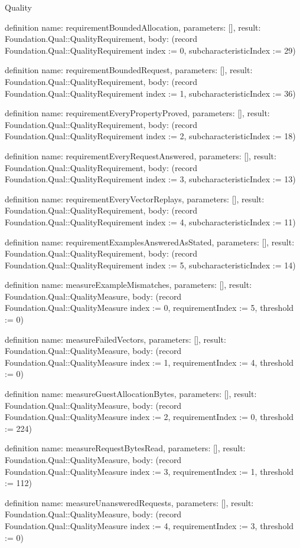 \begin{lexlean}{Quality}
\begin{semanticmodule}
definition{
  name: requirementBoundedAllocation,
  parameters: [],
  result: Foundation.Qual::QualityRequirement,
  body: (record Foundation.Qual::QualityRequirement {index := 0, subcharacteristicIndex := 29})
}

definition{
  name: requirementBoundedRequest,
  parameters: [],
  result: Foundation.Qual::QualityRequirement,
  body: (record Foundation.Qual::QualityRequirement {index := 1, subcharacteristicIndex := 36})
}

definition{
  name: requirementEveryPropertyProved,
  parameters: [],
  result: Foundation.Qual::QualityRequirement,
  body: (record Foundation.Qual::QualityRequirement {index := 2, subcharacteristicIndex := 18})
}

definition{
  name: requirementEveryRequestAnswered,
  parameters: [],
  result: Foundation.Qual::QualityRequirement,
  body: (record Foundation.Qual::QualityRequirement {index := 3, subcharacteristicIndex := 13})
}

definition{
  name: requirementEveryVectorReplays,
  parameters: [],
  result: Foundation.Qual::QualityRequirement,
  body: (record Foundation.Qual::QualityRequirement {index := 4, subcharacteristicIndex := 11})
}

definition{
  name: requirementExamplesAnsweredAsStated,
  parameters: [],
  result: Foundation.Qual::QualityRequirement,
  body: (record Foundation.Qual::QualityRequirement {index := 5, subcharacteristicIndex := 14})
}

definition{
  name: measureExampleMismatches,
  parameters: [],
  result: Foundation.Qual::QualityMeasure,
  body: (record Foundation.Qual::QualityMeasure {index := 0, requirementIndex := 5, threshold := 0})
}

definition{
  name: measureFailedVectors,
  parameters: [],
  result: Foundation.Qual::QualityMeasure,
  body: (record Foundation.Qual::QualityMeasure {index := 1, requirementIndex := 4, threshold := 0})
}

definition{
  name: measureGuestAllocationBytes,
  parameters: [],
  result: Foundation.Qual::QualityMeasure,
  body: (record Foundation.Qual::QualityMeasure {index := 2, requirementIndex := 0, threshold := 224})
}

definition{
  name: measureRequestBytesRead,
  parameters: [],
  result: Foundation.Qual::QualityMeasure,
  body: (record Foundation.Qual::QualityMeasure {index := 3, requirementIndex := 1, threshold := 112})
}

definition{
  name: measureUnansweredRequests,
  parameters: [],
  result: Foundation.Qual::QualityMeasure,
  body: (record Foundation.Qual::QualityMeasure {index := 4, requirementIndex := 3, threshold := 0})
}


\end{semanticmodule}
\end{lexlean}
